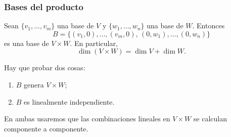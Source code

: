 \begin{frame}
    \frametitle{Bases del producto}

    \begin{theorem}
        Sean $\{v_1,\ldots,v_m\}$ una base de $V$ y
        $\{w_1,\ldots,w_n\}$ una base de $W$. Entonces
        \[
            B=\{(v_1,0),\ldots,(v_m,0),\,(0,w_1),\ldots,(0,w_n)\}
        \]
        es una base de $V\times W$. En particular,
        \[
            \dim(V\times W)=\dim V+\dim W.
        \]
    \end{theorem}

    \medskip

    Hay que probar dos cosas:
    \begin{enumerate}
        \item $B$ genera $V\times W$;
        \item $B$ es linealmente independiente.
    \end{enumerate}
    En ambas usaremos que las combinaciones lineales en $V\times W$
    se calculan componente a componente.
\end{frame}


